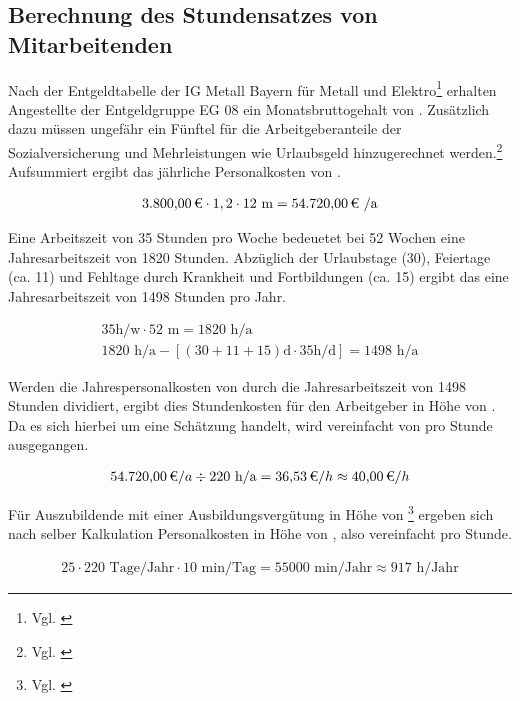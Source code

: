 
\subsection{Berechnung des Stundensatzes von Mitarbeitenden}
\label{app:Stundensatz}
Nach der Entgeldtabelle der IG Metall Bayern für Metall und Elektro\footnote{Vgl. \cite{Entgeldtabelle}} erhalten Angestellte der Entgeldgruppe EG 08 ein Monatsbruttogehalt von . Zusätzlich dazu müssen ungefähr ein Fünftel für die Arbeitgeberanteile der Sozialversicherung und Mehrleistungen wie Urlaubsgeld hinzugerechnet werden.\footnote{Vgl. \cite{Personalkosten}} Aufsummiert ergibt das jährliche Personalkosten von .

\begin{eqnarray}
\eur{3.800,00} \cdot 1,2 \cdot 12 \mbox{ m} = \eur{54.720,00} \mbox{ /a}
\end{eqnarray}

Eine Arbeitszeit von 35 Stunden pro Woche bedeuetet bei 52 Wochen eine Jahresarbeitszeit von 1820 Stunden. Abzüglich der Urlaubstage (30), Feiertage (ca. 11) und Fehltage durch Krankheit und Fortbildungen (ca. 15) ergibt das eine Jahresarbeitszeit von 1498 Stunden pro Jahr.

\begin{eqnarray}
35 \mbox{h/w} \cdot 52 \mbox{ m} = 1820 \mbox{ h/a} \\
1820 \mbox{ h/a} - [(30+11+15) \mbox{d} \cdot 35 \mbox{h/d}] = 1498 \mbox{ h/a}
\end{eqnarray}

Werden die Jahrespersonalkosten von  durch die Jahresarbeitszeit von 1498 Stunden dividiert, ergibt dies Stundenkosten für den Arbeitgeber in Höhe von . Da es sich hierbei um eine Schätzung handelt, wird vereinfacht von  pro Stunde ausgegangen.  

\begin{eqnarray}
\eur{54.720,00} /a \div 220 \mbox{ h/a} = \eur{36,53} /h \approx \eur{40,00} /h 
\end{eqnarray}

Für Auszubildende mit einer Ausbildungsvergütung in Höhe von  \footnote{Vgl. \cite{EntgeldtabelleAzubis}} ergeben sich nach selber Kalkulation Personalkosten in Höhe von , also vereinfacht  pro Stunde.

\begin{eqnarray}
25 \cdot 220 \mbox{ Tage/Jahr} \cdot 10 \mbox{ min/Tag} = 55000 \mbox{ min/Jahr} \approx 917 \mbox{ h/Jahr} 
\end{eqnarray}